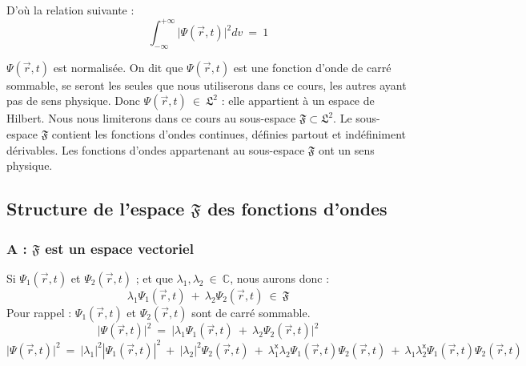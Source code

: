 \documentclass[12pt,a4paper,titlepage]{book}
\begin{document}
D'où la relation suivante :\\
\begin{equation*}
\int_{-\infty}^{+\infty} \vert \Psi (\overrightarrow{r}, t) \vert ^2 dv ~=~ 1
\end{equation*}

$\Psi (\overrightarrow{r}, t)$ est normalisée. On dit que $\Psi (\overrightarrow{r}, t)$ est une fonction d'onde de carré sommable, se seront les seules que nous utiliserons dans ce cours, les autres ayant pas de sens physique. Donc $\Psi (\overrightarrow{r}, t) ~\in~ \mathfrak{L}^2$ : elle appartient à un espace de Hilbert. Nous nous limiterons dans ce cours au sous-espace $\mathfrak{F} \subset \mathfrak{L}^2$. Le sous-espace $\mathfrak{F}$ contient les fonctions d'ondes continues, définies partout et indéfiniment dérivables. Les fonctions d'ondes appartenant au sous-espace $\mathfrak{F}$ ont un sens physique.

\subsection{Structure de l'espace $\mathfrak{F}$ des fonctions d'ondes}
\subsubsection{A : $\mathfrak{F}$ est un espace vectoriel}

Si $\Psi_1 (\overrightarrow{r}, t)$ et $\Psi_2 (\overrightarrow{r}, t)$ ; et que $\lambda_1, \lambda_2 ~\in~ \mathbb{C}$, nous aurons donc :
\begin{equation*}
\lambda_1 \Psi_1 (\overrightarrow{r}, t) ~+~ \lambda_2 \Psi_2 (\overrightarrow{r}, t) ~\in~ \mathfrak{F}
\end{equation*}
Pour rappel : $\Psi_1 (\overrightarrow{r}, t)$ et $\Psi_2 (\overrightarrow{r}, t)$ sont de carré sommable.\\
\begin{equation*}
\vert \Psi (\overrightarrow{r}, t) \vert^2 ~=~ \vert \lambda_1 \Psi_1 (\overrightarrow{r}, t) ~+~ \lambda_2 \Psi_2 (\overrightarrow{r}, t) \vert^2
\end{equation*}
\begin{equation*}
\vert \Psi (\overrightarrow{r}, t) \vert^2 ~=~ |\lambda_1 |^2 |\Psi_1 (\overrightarrow{r}, t)|^2 ~+~ |\lambda_2 |^2 \Psi_2 (\overrightarrow{r}, t) ~+~ \lambda_1^{\mathsf{x}} \lambda_2 \Psi_1 (\overrightarrow{r}, t) \Psi_2 (\overrightarrow{r}, t) ~+~ \lambda_1 \lambda_2^{\mathsf{x}} \Psi_1 (\overrightarrow{r}, t) \Psi_2 (\overrightarrow{r}, t)
\end{equation*}
\end{document}
